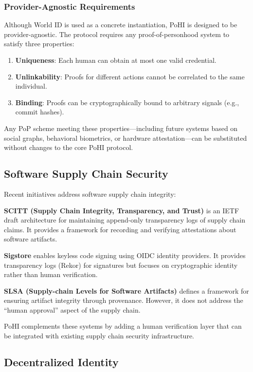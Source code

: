 \documentclass[conference]{IEEEtran}
\begin{document}
\subsubsection{Provider-Agnostic Requirements}
Although World ID is used as a concrete instantiation, PoHI is designed to be provider-agnostic. The protocol requires any proof-of-personhood system to satisfy three properties:
\begin{enumerate}
    \item \textbf{Uniqueness}: Each human can obtain at most one valid credential.
    \item \textbf{Unlinkability}: Proofs for different actions cannot be correlated to the same individual.
    \item \textbf{Binding}: Proofs can be cryptographically bound to arbitrary signals (e.g., commit hashes).
\end{enumerate}
Any PoP scheme meeting these properties---including future systems based on social graphs, behavioral biometrics, or hardware attestation---can be substituted without changes to the core PoHI protocol.

\subsection{Software Supply Chain Security}

Recent initiatives address software supply chain integrity:

\textbf{SCITT (Supply Chain Integrity, Transparency, and Trust)} \cite{scitt} is an IETF draft architecture for maintaining append-only transparency logs of supply chain claims. It provides a framework for recording and verifying attestations about software artifacts.

\textbf{Sigstore} \cite{sigstore} enables keyless code signing using OIDC identity providers. It provides transparency logs (Rekor) for signatures but focuses on cryptographic identity rather than human verification.

\textbf{SLSA (Supply-chain Levels for Software Artifacts)} defines a framework for ensuring artifact integrity through provenance. However, it does not address the ``human approval'' aspect of the supply chain.

PoHI complements these systems by adding a human verification layer that can be integrated with existing supply chain security infrastructure.

\subsection{Decentralized Identity}
\end{document}
